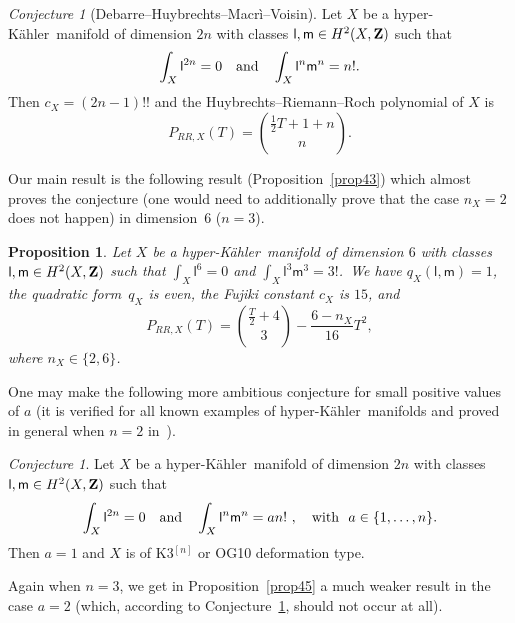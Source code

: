 \documentclass[12pt]{amsart}
\def\Z{{\bf Z}}
\def\hk{hyper-K\"ahler}
\newtheorem{prop}[lemm]{Proposition}
\theoremstyle{remark}
\newtheorem{rema}[lemm]{Remark}
\newtheorem{conj}[lemm]{Conjecture}
\def\lll{\ensuremath{\mathsf l}}
\def\mm{\ensuremath{\mathsf m}}
\begin{document}
\begin{conj}[Debarre--Huybrechts--Macr\`i--Voisin]\label{conjnum}
Let $X$ be a \hk\ manifold of dimension $2n$ with  classes $\lll,\mm\in H^2(X,\Z)$ such that
\[
\int_X\lll^{2n}=0\quad\textnormal{and}\quad\int_X\lll^n\mm^n=n!.
\]
Then $c_X=(2n-1)!!$ and the Huybrechts--Riemann--Roch polynomial of $X$  is
\begin{equation}\label{valp}
 P_{RR,X}(T)= \binom{\frac12 T+1+n}{n}.
\end{equation}
\end{conj}




 Our main result is the following result (Proposition~\ref{prop43}) which almost  proves the conjecture (one would need to additionally prove that the case $n_X=2$ does not happen) in dimension~6 ($n=3$).

\begin{prop}
Let $X$ be a \hk\ manifold of dimension $6$ with  classes $\lll,\mm\in H^2(X,\Z)$ such that
$
\int_X\lll^{6}=0$ and $\int_X\lll^3\mm^3=3!
$.\ We have $q_X(\lll,\mm)=1$, 
  the quadratic form~$q_X$ is even, the Fujiki constant  $c_X$ is $15$, and
$$P_{RR,X}(T)=
  \binom{\frac{T}{2}+4}{3}-\frac{6-n_X}{16}T^2,$$
  where $n_X \in\{2,6 \}$.
  \end{prop}
 
 
 One may make the following more ambitious  conjecture for small positive values of $a$ (it is verified for all known examples of \hk\ manifolds and proved in general when  $n=2$ in~\cite[Theorem~9.3 and Theorem~1.5]{dhmv}).
 
 \begin{conj}\label{c2}
Let $X$ be a \hk\ manifold of dimension $2n$ with  classes $\lll,\mm\in H^2(X,\Z)$ such that
\[
\int_X\lll^{2n}=0\quad\textnormal{and}\quad\int_X\lll^n\mm^n=a n!\ , \quad\textnormal{with }\ a\in\{1,\dots,n\}.
\]
Then $a=1$ and $X$   is   of K3$^{[n]}$ or   OG10 deformation type.
\end{conj}


Again when $n=3$, we get in Proposition~\ref{prop45} a much weaker result in the case $a=2$ (which, according to Conjecture~\ref{c2}, should not occur at all).
\end{document}
